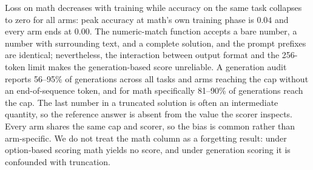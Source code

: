 Loss on math decreases with training while accuracy on the same task collapses to zero for all arms: peak accuracy at math's own training phase is $0.04$ and every arm ends at $0.00$. The numeric-match function accepts a bare number, a number with surrounding text, and a complete solution, and the prompt prefixes are identical; nevertheless, the interaction between output format and the 256-token limit makes the generation-based score unreliable. A generation audit reports 56--95\% of generations across all tasks and arms reaching the cap without an end-of-sequence token, and for math specifically 81--90\% of generations reach the cap. The last number in a truncated solution is often an intermediate quantity, so the reference answer is absent from the value the scorer inspects. Every arm shares the same cap and scorer, so the bias is common rather than arm-specific. We do not treat the math column as a forgetting result: under option-based scoring math yields no score, and under generation scoring it is confounded with truncation.



